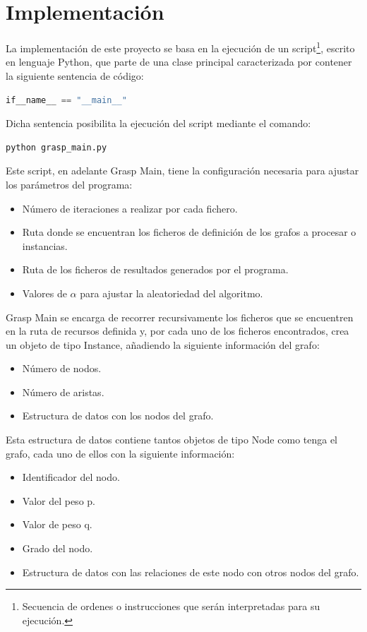 \section{Implementación}
\label{sec:implementacion}
La implementación de este proyecto se basa en la ejecución de un script\footnote{Secuencia de ordenes o instrucciones que serán interpretadas para su ejecución.}, escrito en lenguaje Python, que parte de una clase principal caracterizada por contener la siguiente sentencia de código:
 \begin{lstlisting}[language=Python]
 if__name__ == "__main__"
 \end{lstlisting}
 Dicha sentencia posibilita la ejecución del script mediante el comando:
  \begin{lstlisting}[language=bash]
  python grasp_main.py
 \end{lstlisting} 

 Este script, en adelante Grasp Main, tiene la configuración necesaria para ajustar los parámetros del programa:
 \begin{itemize}
 	\item Número de iteraciones a realizar por cada fichero.
 	\item Ruta donde se encuentran los ficheros de definición de los grafos a procesar o instancias.
 	\item Ruta de los ficheros de resultados generados por el programa.	
 	\item Valores de $\alpha$ para ajustar la aleatoriedad del algoritmo.
 \end{itemize}

Grasp Main se encarga de recorrer recursivamente los ficheros que se encuentren en la ruta de recursos definida y, por cada uno de los ficheros encontrados, crea un objeto de tipo Instance, añadiendo la siguiente información del grafo:
 \begin{itemize}
	\item Número de nodos.
	\item Número de aristas.
	\item Estructura de datos con los nodos del grafo.
\end{itemize}

Esta estructura de datos contiene tantos objetos de tipo Node como tenga el grafo, cada uno de ellos con la siguiente información:
 \begin{itemize}
	\item Identificador del nodo.
	\item Valor del peso p.
	\item Valor de peso q.
	\item Grado del nodo.
	\item Estructura de datos con las relaciones de este nodo con otros nodos del grafo.
\end{itemize}

